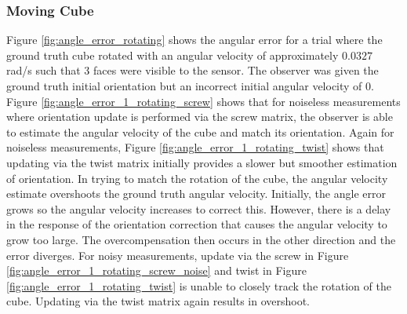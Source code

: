 \subsubsection{Moving Cube}
Figure \ref{fig:angle_error_rotating} shows the angular error for a trial where the ground truth cube rotated with an angular velocity of approximately $0.0327$ rad/s such that 3 faces were visible to the sensor. The observer was given the ground truth initial orientation but an incorrect initial angular velocity of 0.
Figure \ref{fig:angle_error_1_rotating_screw} shows that for noiseless measurements where orientation update is performed via the screw matrix, the observer is able to estimate the angular velocity of the cube and match its orientation. Again for noiseless measurements, Figure \ref{fig:angle_error_1_rotating_twist} shows that updating via the twist matrix initially provides a slower but smoother estimation of orientation. In trying to match the rotation of the cube, the angular velocity estimate overshoots the ground truth angular velocity. Initially, the angle error grows so the angular velocity increases to correct this. However, there is a delay in the response of the orientation correction that causes the angular velocity to grow too large. The overcompensation then occurs in the other direction and the error diverges.
For noisy measurements, update via the screw in Figure \ref{fig:angle_error_1_rotating_screw_noise} and twist in Figure \ref{fig:angle_error_1_rotating_twist} is unable to closely track the rotation of the cube. Updating via the twist matrix again results in overshoot. 

